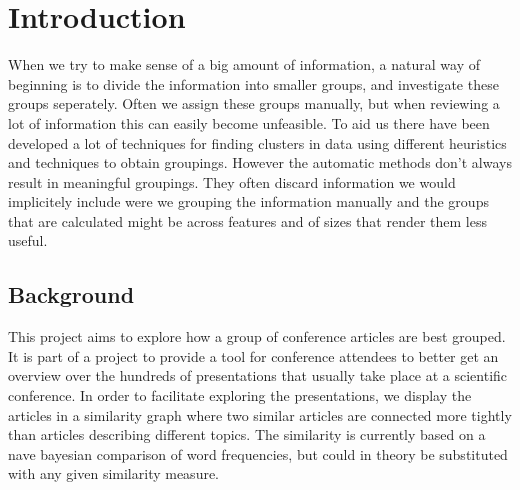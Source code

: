 \section{Introduction}

When we try to make sense of a big amount of information, a natural way 
of beginning is to divide the information into smaller groups, and 
investigate these groups seperately. Often we assign these groups 
manually, but when reviewing a lot of information this can easily become 
unfeasible. To aid us there have been developed a lot of techniques for 
finding clusters in data using different heuristics and techniques to 
obtain groupings. However the automatic methods don't always result in 
meaningful groupings. They often discard information we would 
implicitely include were we grouping the information manually and the 
groups that are calculated might be across features and of sizes that 
render them less useful.

\subsection{Background}

This project aims to explore how a group of conference articles are best 
grouped. It is part of a project to provide a tool for conference 
attendees to better get an overview over the hundreds of presentations 
that usually take place at a scientific conference. In order to 
facilitate exploring the presentations, we display the articles in a 
similarity graph where two similar articles are connected more tightly 
than articles describing different topics. The similarity is currently 
based on a nave bayesian comparison of word frequencies, but 
could in theory be substituted with any given similarity measure.

